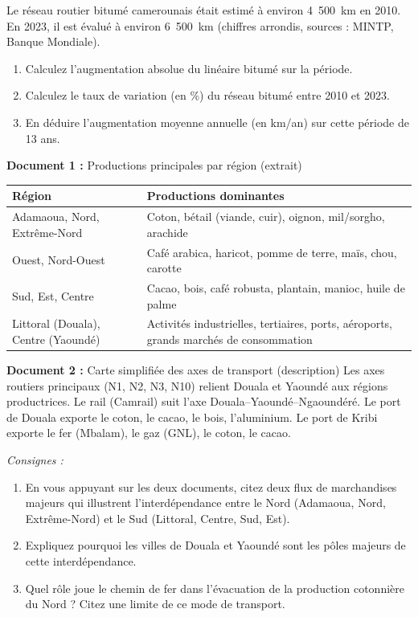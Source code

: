 \documentclass[11pt]{article}
\newcounter{popsec}
\newcounter{popsub}
\newcommand{\courssub}[1]{%
  \stepcounter{popsub}%
  \par\vspace{9pt}\noindent{\popxbold\fontsize{11.5}{13}\selectfont\color{popink}{\color{poporange}\thepopsec.\thepopsub}\hspace{6pt}#1}\par\nopagebreak\vspace{4pt}
}
\begin{document}
\begin{exercice}
Le réseau routier bitumé camerounais était estimé à environ 4~500~km en 2010. En 2023, il est évalué à environ 6~500~km (chiffres arrondis, sources : MINTP, Banque Mondiale).
\begin{enumerate}
    \item Calculez l'augmentation absolue du linéaire bitumé sur la période.
    \item Calculez le taux de variation (en \%) du réseau bitumé entre 2010 et 2023.
    \item En déduire l'augmentation moyenne annuelle (en km/an) sur cette période de 13 ans.
\end{enumerate}
\end{exercice}

\courssub{Je m'entraîne}

\begin{exercice}
\textbf{Document 1 :} Productions principales par région (extrait)
\begin{center}
\begin{tabularx}{\linewidth}{|l|X|}\hline
\textbf{Région} & \textbf{Productions dominantes} \\ \hline
Adamaoua, Nord, Extrême-Nord & Coton, bétail (viande, cuir), oignon, mil/sorgho, arachide \\ \hline
Ouest, Nord-Ouest & Café arabica, haricot, pomme de terre, maïs, chou, carotte \\ \hline
Sud, Est, Centre & Cacao, bois, café robusta, plantain, manioc, huile de palme \\ \hline
Littoral (Douala), Centre (Yaoundé) & Activités industrielles, tertiaires, ports, aéroports, grands marchés de consommation \\ \hline
\end{tabularx}
\end{center}

\textbf{Document 2 :} Carte simplifiée des axes de transport (description)
Les axes routiers principaux (N1, N2, N3, N10) relient Douala et Yaoundé aux régions productrices. Le rail (Camrail) suit l'axe Douala--Yaoundé--Ngaoundéré. Le port de Douala exporte le coton, le cacao, le bois, l'aluminium. Le port de Kribi exporte le fer (Mbalam), le gaz (GNL), le coton, le cacao.

\emph{Consignes :}
\begin{enumerate}
    \item En vous appuyant sur les deux documents, citez deux flux de marchandises majeurs qui illustrent l'interdépendance entre le Nord (Adamaoua, Nord, Extrême-Nord) et le Sud (Littoral, Centre, Sud, Est).
    \item Expliquez pourquoi les villes de Douala et Yaoundé sont les pôles majeurs de cette interdépendance.
    \item Quel rôle joue le chemin de fer dans l'évacuation de la production cotonnière du Nord ? Citez une limite de ce mode de transport.
\end{enumerate}
\end{exercice}
\end{document}
